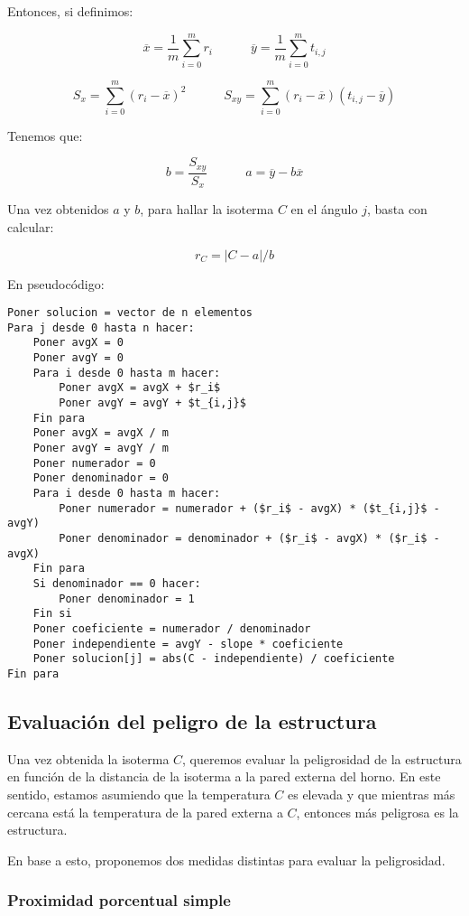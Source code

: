 Entonces, si definimos:

$$\overline{x} = \frac{1}{m}\sum_{i=0}^{m}{r_i} \quad\quad\quad \overline{y} = \frac{1}{m}\sum_{i=0}^{m}{t_{i,j}}$$

$$S_x = \sum_{i=0}^{m}{(r_i - \overline{x})^2} \quad\quad\quad S_{xy} = \sum_{i=0}^{m}{(r_i - \overline{x})(t_{i,j} - \overline{y})}$$

Tenemos que:

$$b = \frac{S_{xy}}{S_x}  \quad\quad\quad a = \overline{y} - b\overline{x}$$

Una vez obtenidos $a$ y $b$, para hallar la isoterma $C$ en el ángulo $j$, basta con calcular:

$$r_C = |C - a|/b$$

En pseudocódigo:

\begin{lstlisting}[mathescape=true]
Poner solucion = vector de n elementos
Para j desde 0 hasta n hacer:
    Poner avgX = 0
    Poner avgY = 0
    Para i desde 0 hasta m hacer:
        Poner avgX = avgX + $r_i$
        Poner avgY = avgY + $t_{i,j}$
    Fin para
    Poner avgX = avgX / m
    Poner avgY = avgY / m
    Poner numerador = 0
    Poner denominador = 0
    Para i desde 0 hasta m hacer:
        Poner numerador = numerador + ($r_i$ - avgX) * ($t_{i,j}$ - avgY)
        Poner denominador = denominador + ($r_i$ - avgX) * ($r_i$ - avgX)
    Fin para
    Si denominador == 0 hacer:
        Poner denominador = 1
    Fin si
    Poner coeficiente = numerador / denominador
    Poner independiente = avgY - slope * coeficiente
    Poner solucion[j] = abs(C - independiente) / coeficiente
Fin para
\end{lstlisting}

\subsection{Evaluación del peligro de la estructura}

Una vez obtenida la isoterma $C$, queremos evaluar la peligrosidad de la estructura en función de la distancia de la isoterma a la pared externa del horno. En este sentido, estamos asumiendo que la temperatura $C$ es elevada y que mientras más cercana está la temperatura de la pared externa a $C$, entonces más peligrosa es la estructura.

En base a esto, proponemos dos medidas distintas para evaluar la peligrosidad.

\subsubsection{Proximidad porcentual simple}

